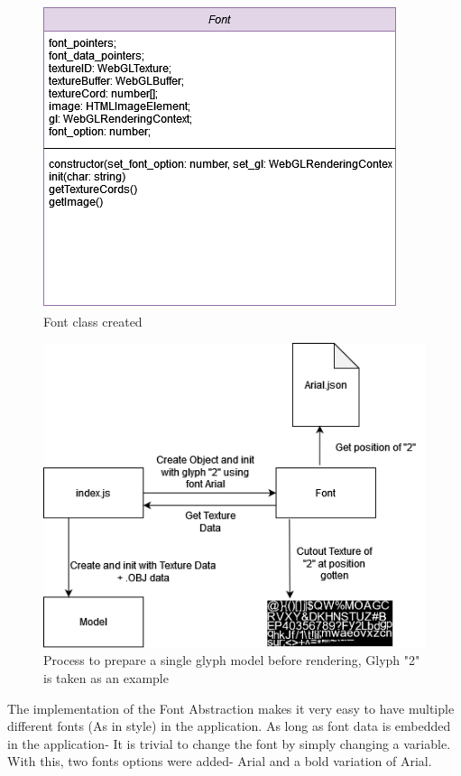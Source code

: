 \begin{figure}[h]
    \centering
    \includegraphics[width=0.8\columnwidth]{author-files/figures/Fontv1.png}
    \caption{Font class created}
    \label{fig:arial}
\end{figure}

\begin{figure}[h]
    \centering
    \includegraphics[width=0.8\columnwidth]{author-files/figures/fontprocess.png}
    \caption{Process to prepare a single glyph model before rendering, Glyph "2" is taken as an example}
    \label{fig:fontprocess}
\end{figure}

The implementation of the Font Abstraction makes it very easy to have multiple different fonts (As in style) in the application. As long as font data is embedded in the application- It is trivial to change the font by simply changing a variable. With this, two fonts options were added- Arial and a bold variation of Arial.


